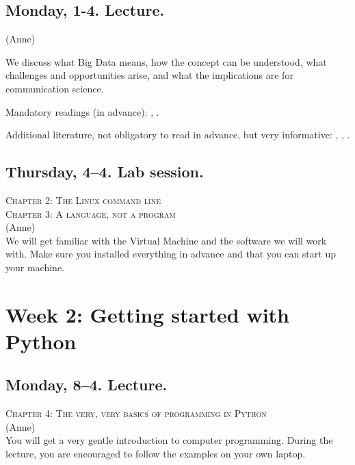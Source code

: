 \documentclass[a4paper,10pt]{report}
\begin{document}
\subsection*{Monday, 1-4. Lecture.}
{\footnotesize{(Anne)}\\}

We discuss what Big Data means, how the concept can be understood, what challenges and opportunities arise, and what the implications are for communication science. 

Mandatory readings (in advance): \citealp{boyd2012}, \citealp{Kitchin2014}. 

Additional literature, not obligatory to read in advance, but very informative: \citealp{Mahrt2013}, \citealp{Vis2013}, \citealp{Trilling2017a}.



\subsection*{Thursday, 4--4. Lab session.}
\textsc{ Chapter 2: The Linux command line}\\
\textsc{ Chapter 3: A language, not a program}\\
{\footnotesize{(Anne)}\\}
We will get familiar with the Virtual Machine and the software we will work with. Make sure you installed everything in advance and that you can start up your machine. 


\section*{Week 2: Getting started with Python}

\subsection*{Monday, 8--4. Lecture.}
\textsc{ Chapter 4: The very, very basics of programming in Python}\\
{\footnotesize{(Anne)}\\}
You will get a very gentle introduction to computer programming. During the lecture, you are encouraged to follow the examples on your own laptop.
\end{document}
